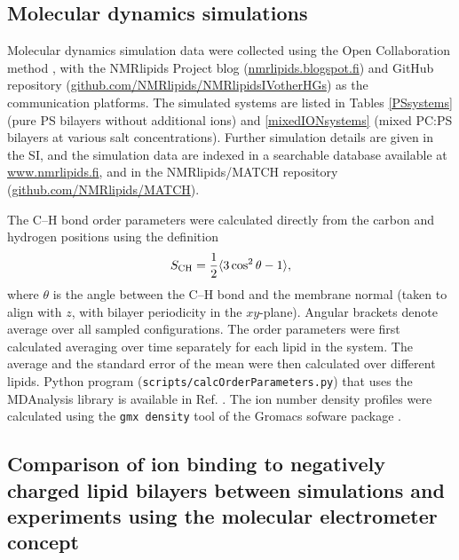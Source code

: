 \documentclass[aps,prl,superscriptaddress,twocolumn]{revtex4}
\begin{document}
\subsection{Molecular dynamics simulations}
Molecular dynamics simulation data were collected using
the Open Collaboration method \cite{botan15}, with
the NMR\-lipids Project blog (\url{nmrlipids.blogspot.fi}) and
GitHub repository (\url{github.com/NMRlipids/NMRlipidsIVotherHGs})
as the communication platforms.
The simulated systems are listed in 
Tables \ref{PSsystems} (pure PS bilayers without additional ions) 
and \ref{mixedIONsystems} (mixed PC:PS bilayers at various salt concentrations).
Further simulation details are given in the SI, and
the simulation data are indexed in a
searchable database available at \url{www.nmrlipids.fi},
and in the NMRlipids/MATCH repository (\url{github.com/NMRlipids/MATCH}).

The C--H bond order parameters were calculated directly
from the carbon and hydrogen positions using the definition
\begin{equation}
S_{\rm CH}=\frac{1}{2}\langle 3\cos^2\theta -1 \rangle,
\end{equation}
where $\theta$ is the angle between the C--H bond and the membrane normal
(taken to align with $z$, with bilayer periodicity in the $xy$-plane).
Angular brackets denote average over all sampled configurations.
The order parameters were first calculated averaging over time separately
for each lipid in the system. The average and
the standard error of the mean were then calculated over different lipids.
Python program ({\tt scripts/calcOrderParameters.py}) that uses the
MDAnalysis library \cite{agrawal11,gowers16} is available in Ref. . 
The ion number density profiles were calculated using the {\tt gmx density} tool
of the Gromacs sofware package \cite{gromacsMANUAL}.

\subsection{Comparison of ion binding to negatively charged lipid bilayers 
between simulations and experiments using the molecular electrometer concept}
\end{document}

